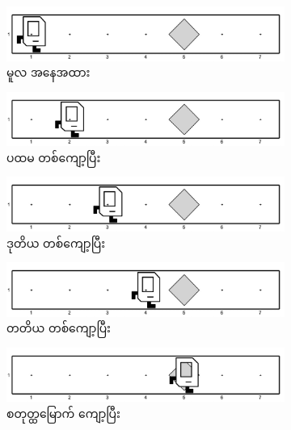\begin{figure}[tb!]
    \hfuzz=100pt
    \newcommand{\figpctw}{0.455}
    \newcommand{\figscale}{0.16}
    \begin{subfigure}[t]{{\figpctw}\textwidth}
        \includegraphics[scale=\figscale]{images/ch02/gpb/init.jpg}
        \caption{မူလ အနေအထား}    
    \end{subfigure}
    \begin{subfigure}[t]{{\figpctw}\textwidth}
        \includegraphics[scale=\figscale]{images/ch02/gpb/1st_iter.jpg}
        \caption{ပထမ တစ်ကျော့ပြီး}    
    \end{subfigure}
    \begin{subfigure}[t]{{\figpctw}\textwidth}
        \includegraphics[scale=\figscale]{images/ch02/gpb/2nd_iter.jpg}
        \caption{ဒုတိယ တစ်ကျော့ပြီး}    
    \end{subfigure}
    \begin{subfigure}[t]{{\figpctw}\textwidth}
        \includegraphics[scale=\figscale]{images/ch02/gpb/3rd_iter.jpg}
        \caption{တတိယ တစ်ကျော့ပြီး}    
    \end{subfigure}
    \begin{subfigure}[t]{{\figpctw}\textwidth}
        \includegraphics[scale=\figscale]{images/ch02/gpb/4th_iter.jpg}
        \caption{စတုတ္ထမြောက် ကျော့ပြီး}    
    \end{subfigure}   
    \caption{}
    \label{fig:gpb_iters}
\end{figure}


